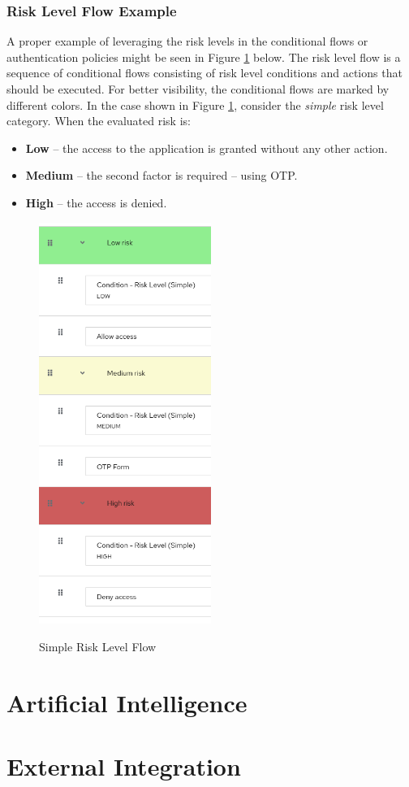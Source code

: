 \subsubsection{Risk Level Flow Example}

A proper example of leveraging the risk levels in the conditional flows or authentication policies might be seen in Figure \ref{fig:risk-levels-example} below.
The risk level flow is a sequence of conditional flows consisting of risk level conditions and actions that should be executed.
For better visibility, the conditional flows are marked by different colors.
\newline
\newline
In the case shown in Figure \ref{fig:risk-levels-example}, consider the \textit{simple} risk level category. When the evaluated risk is:
\begin{itemize}
    \item \textbf{Low} -- the access to the application is granted without any other action.
    \item \textbf{Medium} -- the second factor is required -- using OTP.
    \item \textbf{High} -- the access is denied.
\end{itemize}

\begin{figure}[htbp]
  \centering
  \includegraphics[width=0.5\textwidth]{img/sections/5-design/simple-risk-level-flow.png}
  \label{fig:risk-levels-example}
  \caption{Simple Risk Level Flow}
\end{figure}


\newpage
\section{Artificial Intelligence}

\newpage
\section{External Integration}